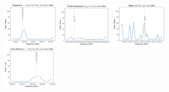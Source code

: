 \documentclass[12pt]{article}
\begin{document}
\begin{figure}
\includegraphics[width=0.245\textwidth]{spw2_t-CH2CHCHO}
\includegraphics[width=0.245\textwidth]{spw2_H213CS}
\includegraphics[width=0.245\textwidth]{spw2_HDO}
\includegraphics[width=0.245\textwidth]{spw2_t-CH3CH2OH}

\end{figure}
\end{document}
